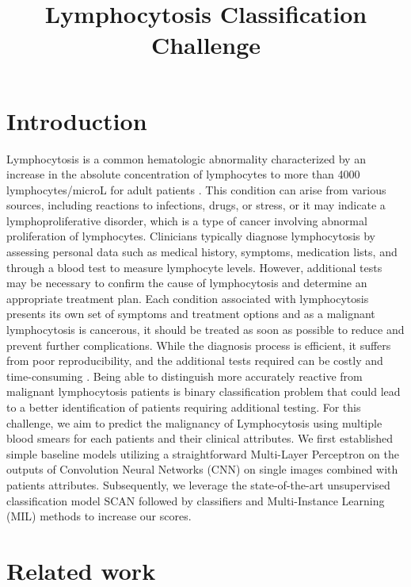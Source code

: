 \documentclass{midl}
\title[DLMI]{Lymphocytosis Classification Challenge}
\begin{document}
\maketitle

\begin{abstract}
\end{abstract}

\section{Introduction}
\label{sec:introduction}

Lymphocytosis is a common hematologic abnormality characterized by an increase in the absolute concentration of lymphocytes to more than 4000 lymphocytes/microL for adult patients \cite{Hamad_2023}. This condition can arise from various sources, including reactions to infections, drugs, or stress, or it may indicate a lymphoproliferative disorder, which is a type of cancer involving abnormal proliferation of lymphocytes. Clinicians typically diagnose lymphocytosis by assessing personal data such as medical history, symptoms, medication lists, and through a blood test to measure lymphocyte levels. However, additional tests may be necessary to confirm the cause of lymphocytosis and determine an appropriate treatment plan. Each condition associated with lymphocytosis presents its own set of symptoms and treatment options and as a malignant lymphocytosis is cancerous, it should be treated as soon as possible to reduce and prevent further complications. While the diagnosis process is efficient, it suffers from poor reproducibility, and the additional tests required can be costly and time-consuming \cite{Sahasrabudhe_2021}. Being able to distinguish more accurately reactive from malignant lymphocytosis patients is binary classification problem that could lead to a better identification of patients requiring additional testing.
For this challenge, we aim to predict the malignancy of Lymphocytosis using multiple blood smears for each patients and their clinical attributes. We first established simple baseline models utilizing a straightforward Multi-Layer Perceptron on the outputs of Convolution Neural Networks (CNN) on single images combined with patients attributes. Subsequently, we leverage the state-of-the-art unsupervised classification model SCAN followed by classifiers and Multi-Instance Learning (MIL) methods to increase our scores.

\section{Related work}
\label{sec:introduction}
\end{document}

